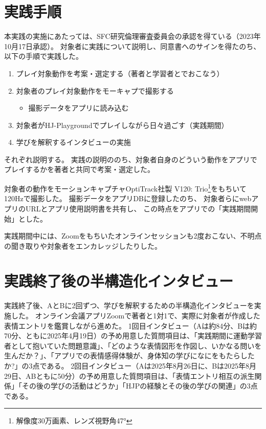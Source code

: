 \section{実践手順}
本実践の実施にあたっては、SFC研究倫理審査委員会の承認を得ている（2023年10月17日承認）。
対象者に実践について説明し、同意書へのサインを得たのち、以下の手順で実践した。
\begin{enumerate}
  \item プレイ対象動作を考案・選定する（著者と学習者とでおこなう）
  \item 対象者のプレイ対象動作をモーキャプで撮影する
  \begin{itemize}
    \item 撮影データをアプリに読み込む
  \end{itemize}  
  \item 対象者がHJ-Playgroundでプレイしながら日々過ごす（実践期間）
  \item 学びを解釈するインタビューの実施
\end{enumerate}

それぞれ説明する。
実践の説明ののち、対象者自身のどういう動作をアプリでプレイするかを著者と共同で考案・選定した。

対象者の動作をモーションキャプチャOptiTrack社製 V120: Trio\footnote{
解像度30万画素、レンズ視野角47°
}をもちいて120Hzで撮影した。
撮影データをアプリDBに登録したのち、
対象者らにwebアプリのURLとアプリ使用説明書を共有し、
この時点をアプリでの「実践期間開始」とした。

実践期間中には、Zoomをもちいたオンラインセッションも2度おこない、不明点の聞き取りや対象者をエンカレッジしたりした。

\section{実践終了後の半構造化インタビュー}
実践終了後、AとBに2回ずつ、学びを解釈するための半構造化インタビューを実施した。
オンライン会議アプリZoomで著者と1対1で、実際に対象者が作成した表情エントリを鑑賞しながら進めた。
1回目インタビュー（Aは約84分、Bは約70分、ともに2025年4月19日）の予め用意した質問項目は、「実践期間に運動学習者として抱いていた問題意識」、「どのような表情図形を作図し、いかなる問いを生んだか？」、「アプリでの表情感得体験が、身体知の学びになにをもたらしたか?」の3点である。
2回目インタビュー（Aは2025年8月26日に、Bは2025年8月29日、ABともに50分）の予め用意した質問項目は、「表情エントリ相互の派生関係」「その後の学びの活動はどうか」「HJPの経験とその後の学びの関連」の3点である。

